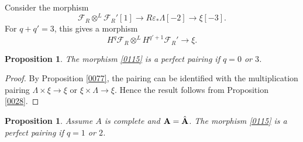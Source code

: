 \documentclass{amsart}
\newtheorem{Prop}[Thm]{Proposition}
\theoremstyle{remark}
\numberwithin{equation}{subsection}
\newcommand{\tensor}{\mathbin{\otimes}}
\newcommand{\alg}[1]{\mathbf{#1}}
\begin{document}
Consider the morphism
	\[
				\mathcal{F}_{R}
			\tensor^{L}
				\mathcal{F}_{R}'[1]
		\to
			R \varepsilon_{\ast} \Lambda[-2]
		\to
			\xi[-3].
	\]
For $q + q' = 3$, this gives a morphism
	\begin{equation} \label{0115}
				H^{q} \mathcal{F}_{R}
			\tensor^{L}
				H^{q' + 1} \mathcal{F}_{R}'
		\to
			\xi.
	\end{equation}

\begin{Prop} \label{0289}
	The morphism \eqref{0115}
	is a perfect pairing if $q = 0$ or $3$.
\end{Prop}

\begin{proof}
	By Proposition \ref{0077},
	the pairing can be identified with the multiplication pairing
	$\Lambda \times \xi \to \xi$ or $\xi \times \Lambda \to \xi$.
	Hence the result follows from
	Proposition \ref{0028}.
\end{proof}

\begin{Prop} \label{0290}
	Assume $A$ is complete and $\alg{A} = \Hat{\alg{A}}$.
	The morphism \eqref{0115} is a perfect pairing if $q = 1$ or $2$.
\end{Prop}
\end{document}
